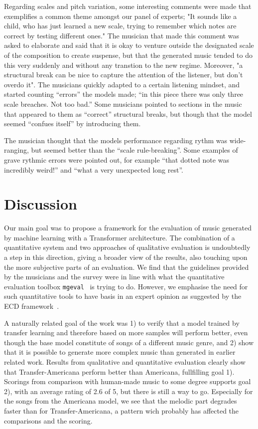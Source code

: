 \documentclass{IEEEtran}
\begin{document}
Regarding scales and pitch variation, some interesting comments were 
made that exemplifies a common theme amongst our panel of experts;
"It sounds like a child, who has just learned a new scale, trying 
to remember which notes are correct by testing different ones." 
The musician that made this comment was asked to elaborate and 
said that it is okay to venture outside the designated scale of the 
composition to create suspense, but that the generated music tended 
to do this very suddenly and without any transtion to the new 
regime. Moreover, "a structural break
can be nice to capture the attention of the listener, but don't overdo
it". The musicians quickly adapted to a certain listening mindset, and
started counting ``errors'' the models made; ``in this piece there was 
only three scale breaches. Not too bad.'' Some musicians pointed to sections 
in the music that appeared to them as ``correct'' structural breaks, but 
though that the model seemed ``confues itself'' by introducing them.

The musician thought that the models performance regarding rythm 
was wide-ranging, but seemed better than the ``scale rule-breaking''.
Some examples of grave rythmic errors were pointed out, for example
``that dotted note was incredibly weird!'' and  ``what a very unexpected 
long rest''.

\section{Discussion}

Our main goal was to propose a framework for the evaluation of music generated
by machine learning with a Transformer architecture.
The combination of a quantitative system and two approaches of qualitative
evaluation is undoubtedly a step in this direction, giving a broader view of 
the results, also touching upon the more
subjective parts of an evaluation. We find that the guidelines provided by 
the musicians and the survey were in line with what the quantitative evaluation 
toolbox \lstinline|mgeval|~\cite{yang2020evaluation} is trying to 
do. However, we emphasise the need for such quantitative tools to have basis
in an expert opinion as suggested by the ECD
framework~\cite{mislevy2003focus,mislevy2017evidence}.

A naturally related goal of the work was 1) to verify that a model trained by transfer
learning and therefore based on more samples will perform better, even though
the base model constitute of songs of a different music genre, and 2) show
that it is possible to generate more complex music than generated in earlier
related work. Results from qualitative and quantitative evaluation clearly
show that Transfer-Americana perform better than Americana, fullfilling goal
1). Scorings from comparison with human-made music to some degree supports
goal 2), with an average rating of 2.6 of 5, but there is still a way to go.
Especially for the songs from the Americana model, we see that the melodic
part degrades faster than for Transfer-Americana, a pattern wich probably has
affected the comparisons and the scoring.
\end{document}

